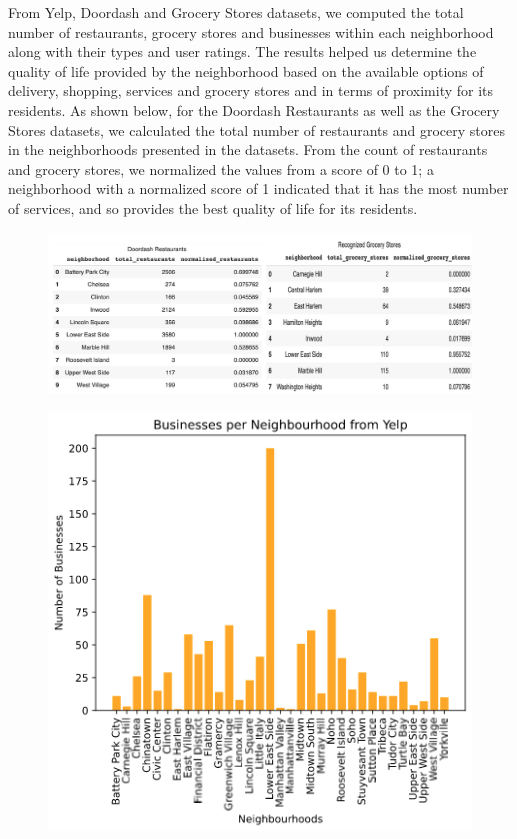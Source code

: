 \documentclass{article}
\begin{document}
From Yelp, Doordash and Grocery Stores datasets, we computed the total number of restaurants, grocery stores and businesses within each neighborhood along with their types and user ratings. The results helped us determine the quality of life provided by the neighborhood based on the available options of delivery, shopping, services and grocery stores and in terms of proximity for its residents. As shown below, for the Doordash Restaurants as well as the Grocery Stores datasets, we calculated the total number of restaurants and grocery stores in the neighborhoods presented in the datasets. From the count of restaurants and grocery stores, we normalized the values from a score of 0 to 1; a neighborhood with a normalized score of 1 indicated that it has the most number of services, and so provides the best quality of life for its residents. 

\begin{figure}[h]
\centering
\includegraphics[scale=0.5]{Normalized.png}
\end{figure}

\begin{figure}[h]
\centering
\includegraphics[scale=0.5]{from_yelp.png}
\end{figure}
\end{document}
